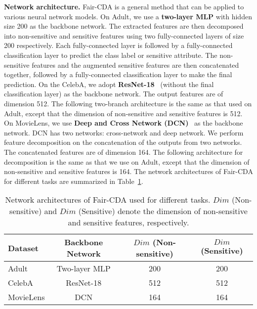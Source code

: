 \noindent\textbf{Network architecture.} Fair-CDA is a general method that can be applied to various neural network models. On Adult, we use a \textbf{two-layer MLP} with hidden size 200 as the backbone network. The extracted features are then decomposed into non-sensitive and sensitive features using two fully-connected layers of size 200 respectively. Each fully-connected layer is followed by a fully-connected classification layer to predict the class label or sensitive attribute. The non-sensitive features and the augmented sensitive features are then concatenated together, followed by a fully-connected classification layer to make the final prediction. On the CelebA, we adopt \textbf{ResNet-18}~\cite{he2016deep} (without the final classification layer) as the backbone network. The output features are of dimension 512. The following two-branch architecture is the same as that used on Adult, except that the dimension of non-sensitive and sensitive features is 512. On MovieLens, we use \textbf{Deep and Cross Network (DCN)}~\cite{wang2017deep} as the backbone network. DCN has two networks: cross-network and deep network. We perform feature decomposition on the concatenation of the outputs from two networks. The concatenated features are of dimension 164. The following architecture for decomposition is the same as that we use on Adult, except that the dimension of non-sensitive and sensitive features is 164. The network architectures of Fair-CDA for different tasks are summarized in Table~\ref{table:decomposition}.

\begin{table}[t]
\centering
\caption{Network architectures of Fair-CDA used for different tasks. $Dim$ (Non-sensitive) and $Dim$ (Sensitive) denote the dimension of non-sensitive and sensitive features, respectively.}
\label{table:decomposition}
    \begin{adjustbox}{max width=0.47\textwidth}
        \begin{tabular}{lccc}
        \hline
        \hline
        Dataset & Backbone Network & $Dim$ (Non-sensitive) &  $Dim$ (Sensitive) \\
        \hline
        Adult	& Two-layer MLP & 200 & 200	 \\
        \hline
        CelebA	& ResNet-18 & 512 & 512  \\
        \hline
        MovieLens	& DCN   &  164 & 164 \\
        \hline
        \hline
        \end{tabular}
    \end{adjustbox}
    \vspace{-5pt}
\end{table}

